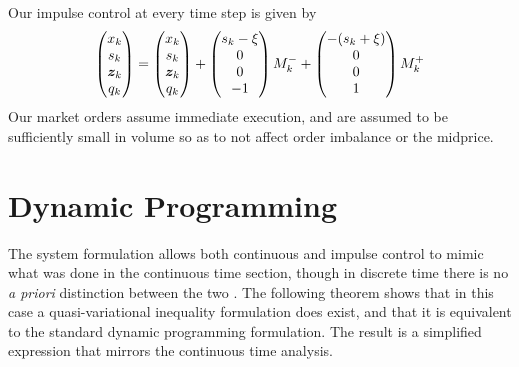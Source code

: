 Our impulse control at every time step is given by
\begin{equation}\label{eq:discretestateimpulse}
\begin{pmatrix}
x_{k} \\
s_{k} \\
\bm{z}_{k} \\
q_{k} 
\end{pmatrix} = \begin{pmatrix}
x_{k} \\
s_{k} \\
\bm{z}_{k} \\
q_{k}
\end{pmatrix}
+ \begin{pmatrix}
s_k - \xi \\
0 \\
0 \\
-1
\end{pmatrix}M_k^-
+ \begin{pmatrix}
- (s_k + \xi) \\
0 \\
0 \\
1
\end{pmatrix} M_k^+
\end{equation}
Our market orders assume immediate execution, and are assumed to be sufficiently small in volume so as to not affect order imbalance or the midprice. 

\section{Dynamic Programming}
The system formulation allows both continuous and impulse control to mimic what was done in the continuous time section, though in discrete time there is no \textit{a priori} distinction between the two \citep{Bens08}. The following theorem shows that in this case a quasi-variational inequality formulation does exist, and that it is equivalent to the standard dynamic programming formulation. The result is a simplified expression that mirrors the continuous time analysis.


